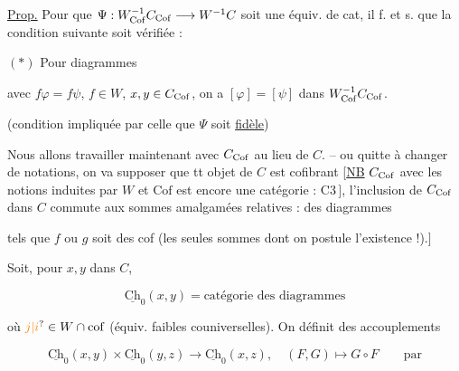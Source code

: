 \uline{Prop.} Pour que $\Psi:W_{\rm Cof}^{-1}C_{\rm Cof}\longrightarrow W^{-1}C$ soit une équiv. de cat, il f. et s. que la condition suivante soit vérifiée :

$(\ast)$ Pour  diagrammes


avec $f\varphi=f\psi$, $f\in W$, $x,y\in C_{\rm Cof}$,  on a $[\varphi]=[\psi]$ dans $W_{\rm Cof}^{-1}C_{\rm Cof}$.

(condition impliquée par celle que $\Psi$ soit \uline{fidèle})

Nous allons travailler maintenant avec $C_{\rm Cof}$ au lieu de $C$. -- ou quitte à changer de notations, on va supposer que tt objet de $C$ est cofibrant [\uline{NB} $C_{\rm Cof}$ avec les notions induites par $W$ et $\mathrm{Cof}$ est encore une catégorie  : C3\,$]$, l'inclusion de $C_{\rm Cof}$ dans $C$ commute aux sommes amalgamées  relatives : des diagrammes


tels que $f$ ou $g$ soit des cof (les seules sommes dont on postule l'existence !).$]$

Soit, pour $x,y$ dans $C$,

\[
 \underline{\mathrm{Ch}}_0(x,y)=\text{catégorie des diagrammes}
\]


où $\unsure{j|i}\in W\cap\mathrm{cof}$  (équiv. faibles  couniverselles). On définit des accouplements

\[
 \underline{\mathrm{Ch}}_0(x,y)\times\underline{\mathrm{Ch}}_0(y,z)\longrightarrow
 \underline{\mathrm{Ch}}_0(x,z),\quad (F,G)\longmapsto G\circ F\qquad\text{par}
\]

